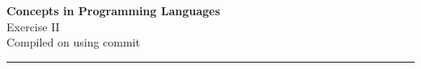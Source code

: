 \documentclass{supervision}
\begin{document}
	
\newcommand{\course}{Concepts in Programming Languages}
\newcommand{\week}{II}
\newcommand{\topics}{}

\begin{center}
\LARGE {\textbf{\color{campurpledark} \course} }\\[-0.2cm]
\Large \color{campurpledark} Exercise \week\\
{
	\footnotesize Compiled on  using commit 
}
\end{center}

{\color{campurple}\hrule}

\newcommand{\terminal}[1]{\texttt{\color{campurple}#1}}
\newcommand{\bl}[1]{{\color{black}#1}}

\vspace{0.5cm}

\end{document}
